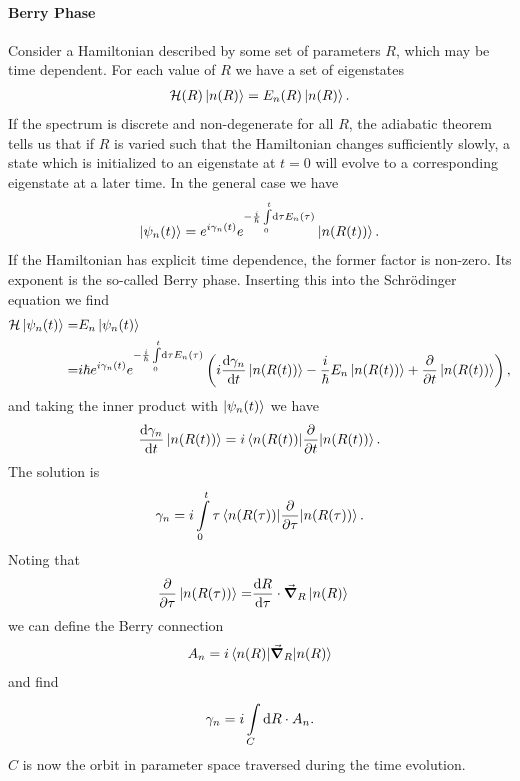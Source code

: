 \paragraph{Berry Phase}
Consider a Hamiltonian described by some set of parameters $R$, which may be time dependent. For each value of $R$ we have a set of eigenstates
\begin{align*}
	\mathcal{H}(R)\ket{n(R)} = E_{n}(R)\ket{n(R)}.
\end{align*}
If the spectrum is discrete and non-degenerate for all $R$, the adiabatic theorem tells us that if $R$ is varied such that the Hamiltonian changes sufficiently slowly, a state which is initialized to an eigenstate at $t = 0$ will evolve to a corresponding eigenstate at a later time. In the general case we have
\begin{align*}
	\ket{\psi_{n}(t)} = e^{i\gamma_{n}(t)}e^{-\frac{i}{\hbar}\int\limits_{0}^{t}\dd{\tau} E_{n}(\tau)}\ket{n(R(t))}.
\end{align*}
If the Hamiltonian has explicit time dependence, the former factor is non-zero. Its exponent is the so-called Berry phase. Inserting this into the Schrödinger equation we find
\begin{align*}
	\mathcal{H}\ket{\psi_{n}(t)} =& E_{n}\ket{\psi_{n}(t)} \\
	=& i\hbar e^{i\gamma_{n}(t)}e^{-\frac{i}{\hbar}\int\limits_{0}^{t}\dd{\tau} E_{n}(\tau)}\left(i\dv{\gamma_{n}}{t}\ket{n(R(t))} - \frac{i}{\hbar}E_{n} \ket{n(R(t))} + \pdv{t}\ket{n(R(t))}\right),
\end{align*}
and taking the inner product with $\ket{\psi_{n}(t)}$ we have
\begin{align*}
	\dv{\gamma_{n}}{t}\ket{n(R(t))} = i\expval{\pdv{t}}{n(R(t))}.
\end{align*}
The solution is
\begin{align*}
	\gamma_{n} = i\int\limits_{0}^{t}\tau\expval{\pdv{\tau}}{n(R(\tau))}.
\end{align*}
Noting that
\begin{align*}
	\pdv{\tau}\ket{n(R(\tau))} =& \dv{R}{\tau}\cdot\grad_{R}\ket{n(R)}
\end{align*}
we can define the Berry connection
\begin{align*}
	A_{n} = i\expval{\grad_{R}}{n(R)}
\end{align*}
and find
\begin{align*}
	\gamma_{n} = i\int\limits_{C}^{}\dd{R}\cdot A_{n}.
\end{align*}
$C$ is now the orbit in parameter space traversed during the time evolution.

